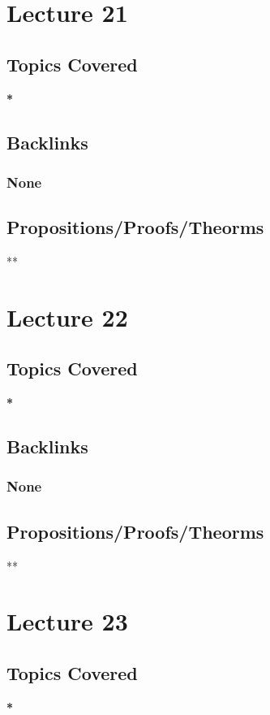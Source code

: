 \documentclass[11pt]{article}
\begin{document}
\section*{Lecture 21}
\label{sec:org5b44015}
\subsection*{Topics Covered}
\label{sec:org1a998ec}
\textbf{*}
\subsection*{Backlinks}
\label{sec:orge511590}
\subsubsection*{None}
\label{sec:orgb14c840}
\subsection*{Propositions/Proofs/Theorms}
\label{sec:orgc7f7824}
**

\section*{Lecture 22}
\label{sec:orgb82a054}
\subsection*{Topics Covered}
\label{sec:org4f1efbf}
\textbf{*}
\subsection*{Backlinks}
\label{sec:orgbb34d19}
\subsubsection*{None}
\label{sec:org2103024}
\subsection*{Propositions/Proofs/Theorms}
\label{sec:orgd548a1c}
**

\section*{Lecture 23}
\label{sec:org06a2b2a}
\subsection*{Topics Covered}
\label{sec:orgaf9304e}
\textbf{*}
\end{document}
